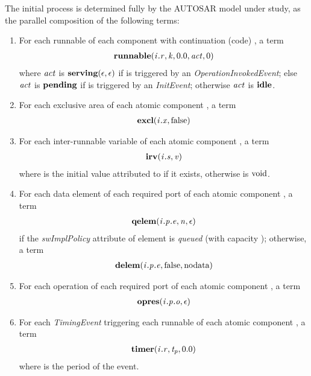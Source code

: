 \documentclass[twocolumn]{article}
\begin{document}
The initial process  is determined fully by the AUTOSAR model under study, as the parallel composition of the following terms:
\begin{enumerate}

\item For each runnable  of each component  with continuation (code) , a term
\[
\begin{array}{c}
  \Trunnable{\Tr{\V{R}}{\V{I}}}{\V{K}}{0.0}{\Act}{0}
\end{array}
\]
where $\Act$ is $\textbf{serving}(\epsilon,\epsilon)$ if  is triggered by an \emph{OperationInvokedEvent}; else $\Act$ is $\textbf{pending}$ if  is triggered by an \emph{InitEvent}; otherwise $\Act$ is $\textbf{idle}$.

\item For each exclusive area  of each atomic component , a term
\[
\begin{array}{c}
  \Texcl{\Tx{\V{X}}{\V{I}}}{\Tfalse}
\end{array}
\]

\item For each inter-runnable variable  of each atomic component , a term
\[
\begin{array}{c}
  \Tirv{\Ts{\V{S}}{\V{I}}}{\V{V}}
\end{array}
\]
where  is the initial value attributed to  if it exists, otherwise  is $\text{void}$.

\item For each data element  of each required port  of each atomic component , a term
\[
\begin{array}{c}
  \Tqelem{\Tep{\V{E}}{\V{P}}{\V{I}}}{\V{N}}{\epsilon}
\end{array}
\]
if the \emph{swImplPolicy} attribute of element  is \emph{queued} (with capacity ); otherwise, a term
\[
\begin{array}{c}
  \Tdelem{\Tep{\V{E}}{\V{P}}{\V{I}}}{\Tfalse}{\text{nodata}}
\end{array}
\]

\item For each operation  of each required port  of each atomic component , a term
\[
\begin{array}{c}
  \Topres{\Tep{\V{O}}{\V{P}}{\V{I}}}{\epsilon}
\end{array}
\]

\item For each \emph{TimingEvent} triggering each runnable  of each atomic component , a term
\[
\begin{array}{c}
  \Ttimer{\Tr{\V{R}}{\V{I}}}{\V{T_p}}{0.0}
\end{array}
\]
where  is the period of the event.

\end{enumerate}
\end{document}
